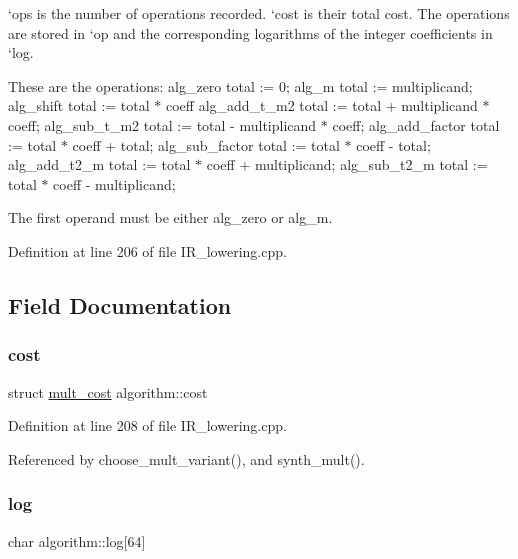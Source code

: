 `ops\textquotesingle{} is the number of operations recorded. `cost\textquotesingle{} is their total cost. The operations are stored in `op\textquotesingle{} and the corresponding logarithms of the integer coefficients in `log\textquotesingle{}.

These are the operations\+: alg\+\_\+zero total \+:= 0; alg\+\_\+m total \+:= multiplicand; alg\+\_\+shift total \+:= total $\ast$ coeff alg\+\_\+add\+\_\+t\+\_\+m2 total \+:= total + multiplicand $\ast$ coeff; alg\+\_\+sub\+\_\+t\+\_\+m2 total \+:= total -\/ multiplicand $\ast$ coeff; alg\+\_\+add\+\_\+factor total \+:= total $\ast$ coeff + total; alg\+\_\+sub\+\_\+factor total \+:= total $\ast$ coeff -\/ total; alg\+\_\+add\+\_\+t2\+\_\+m total \+:= total $\ast$ coeff + multiplicand; alg\+\_\+sub\+\_\+t2\+\_\+m total \+:= total $\ast$ coeff -\/ multiplicand;

The first operand must be either alg\+\_\+zero or alg\+\_\+m. 

Definition at line 206 of file I\+R\+\_\+lowering.\+cpp.



\subsection{Field Documentation}
\mbox{\label{structalgorithm_a66dd89ea547e18bf2948b01d102fa2ba}} 
\subsubsection{\texorpdfstring{cost}{cost}}
{\footnotesize\ttfamily struct \hyperlink{structmult__cost}{mult\+\_\+cost} algorithm\+::cost}



Definition at line 208 of file I\+R\+\_\+lowering.\+cpp.



Referenced by choose\+\_\+mult\+\_\+variant(), and synth\+\_\+mult().

\mbox{\label{structalgorithm_a0f40f44d4dac45fe39056b9ee3ace7af}} 
\subsubsection{\texorpdfstring{log}{log}}
{\footnotesize\ttfamily char algorithm\+::log\mbox{[}64\mbox{]}}



